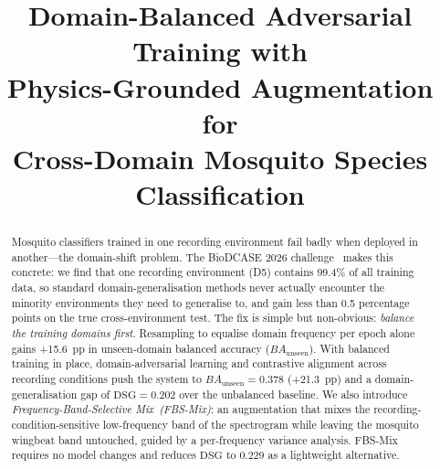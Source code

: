 \documentclass[conference,a4paper]{IEEEtran}
\title{Domain-Balanced Adversarial Training with\\
Physics-Grounded Augmentation for\\
Cross-Domain Mosquito Species Classification}
\author{%
  \IEEEauthorblockN{Sulagna Saha}
  \IEEEauthorblockA{Mila -- Quebec AI Institute\\
    Université de Montréal\\
    \texttt{saha23s@mtholyoke.edu}}
}
\newcommand{\BAu}{BA_{\text{unseen}}}
\newcommand{\DSG}{\mathrm{DSG}}
\begin{document}
\maketitle

\begin{abstract}
Mosquito classifiers trained in one recording environment fail badly
when deployed in another---the domain-shift problem.
The BioDCASE 2026 challenge~\cite{biodcase2026} makes this concrete:
we find that one recording environment (D5) contains 99.4\% of all
training data, so standard domain-generalisation methods never
actually encounter the minority environments they need to generalise
to, and gain less than 0.5 percentage points on the true
cross-environment test.
The fix is simple but non-obvious: \textit{balance the training
domains first}.
Resampling to equalise domain frequency per epoch alone gains
+15.6~pp in unseen-domain balanced accuracy ($\BAu$).
With balanced training in place, domain-adversarial learning and
contrastive alignment across recording conditions push the system to
$\BAu{=}0.378$ (+21.3~pp) and a domain-generalisation gap of
$\DSG{=}0.202$ over the unbalanced baseline.
We also introduce \textit{Frequency-Band-Selective Mix~(FBS-Mix)}: an
augmentation that mixes the recording-condition-sensitive
low-frequency band of the spectrogram while leaving the mosquito
wingbeat band untouched, guided by a per-frequency variance analysis.
FBS-Mix requires no model changes and reduces $\DSG$ to 0.229 as a
lightweight alternative.
\end{abstract}











\end{document}
